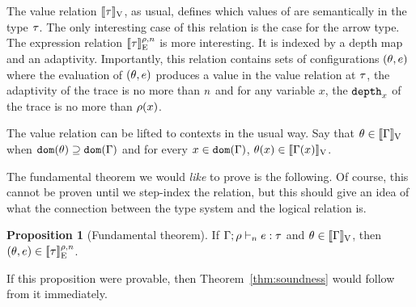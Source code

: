 \documentclass[a4paper,11pt]{article}
\theoremstyle{definition}
\newtheorem{prop}[thm]{Proposition}
\begin{document}
The value relation $[\![ \tau ]\!]_{\text{V}}$, as usual, defines which values of
are semantically in the type $\tau$. The only interesting case of
this relation is the case for the arrow type. The expression relation
$[\![ \tau ]\!]_{\text{E}}^{\rho, n}$ is more interesting. It is indexed by a
depth map and an adaptivity. Importantly, this relation contains sets
of configurations $(\theta, e)$ where the evaluation of $(\theta,
e)$ produces a value in the value relation at $\tau$, the
adaptivity of the trace is no more than $n$ and for any variable
$x$, the $\mathtt{depth}_{x}$ of the trace is no more than $\rho(x)$.

The value relation can be lifted to contexts in the usual way. Say
that $\theta \in [\![ \Gamma ]\!]_{\text{V}}$ when $\mathtt{dom}(\theta) \supseteq \mathtt{dom}(\Gamma)$
and for every $x \in \mathtt{dom}(\Gamma)$, $\theta(x) \in [\![ \Gamma(x) ]\!]_{\text{V}}$.

The fundamental theorem we would \emph{like} to prove is the
following. Of course, this cannot be proven until we step-index the
relation, but this should give an idea of what the connection between
the type system and the logical relation is.

\begin{prop}[Fundamental theorem]
  If $\Gamma; \rho \vdash_{n} e: \tau$ and $\theta \in
  [\![ \Gamma ]\!]_{\text{V}}$, then $(\theta, e) \in [\![ \tau ]\!]_{\text{E}}^{\rho, n}$.
\end{prop}

If this proposition were provable, then Theorem~\ref{thm:soundness}
would follow from it immediately.







\end{document}
